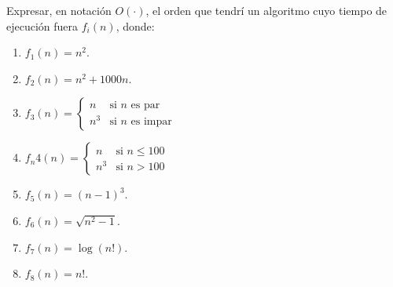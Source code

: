 \begin{ejercicio}
    Expresar, en notación $O(\cdot)$, el orden que tendrí un algoritmo cuyo tiempo de ejecución fuera $f_i(n)$, donde:
    \begin{enumerate}
        \item $f_1(n) = n^2$.
        \item $f_2(n) = n^2+1000n$.
        \item $f_3(n) = \begin{cases}
            n & \text{si } n \text{ es par} \\
            n^3 & \text{si } n \text{ es impar}
        \end{cases}$
        \item $f_n4(n)=\begin{cases}
            n & \text{si } n\leq 100 \\
            n^3 & \text{si } n > 100
        \end{cases}$
        \item $f_5(n) = (n-1)^3$.
        \item $f_6(n) = \sqrt{n^2-1}$.
        \item $f_7(n) = \log(n!)$.
        \item $f_8(n) = n!$.
    \end{enumerate}
\end{ejercicio}

